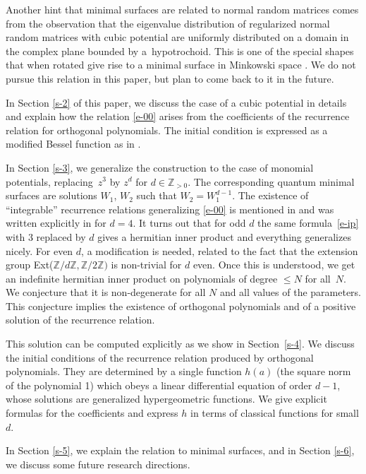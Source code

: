\documentclass[10pt,a4paper]{amsart}
\numberwithin{equation}{section}
\theoremstyle{definition}
\begin{document}
Another hint that minimal surfaces are related to normal random matrices comes from the observation that the eigenvalue distribution of regularized normal random matrices \cite{ElbauFelder2005,WiegmannZabrodin2000} with cubic potential are uniformly distributed on a domain in the complex plane bounded by a~hypotrochoid. This is one of the special shapes that when rotated give rise to a minimal surface in Minkowski space \cite{Hoppe2009}. We do not pursue this relation in this paper, but plan to come back to it in the future.

In Section \ref{s-2} of this paper, we discuss the case of a cubic potential in details and explain how the relation \eqref{e-00} arises from the coefficients of the recurrence relation for orthogonal polynomials. The initial condition is expressed as a modified Bessel function as in \cite{CDHM2025,Hoppe2025}.

In Section \ref{s-3}, we generalize the construction to the case of monomial potentials, replacing~$z^3$ by $z^d$ for $d\in\mathbb Z_{>0}$. The corresponding quantum minimal surfaces are solutions $W_1$, $W_2$ such that $W_2=W_1^{d-1}$. The existence of ``integrable'' recurrence relations generalizing \eqref{e-00} is mentioned in \cite{AHK2019} and was written explicitly in \cite{CDHM2025,Hoppe2025} for $d=4$. It turns out that for odd $d$ the same formula~\eqref{e-ip} with $3$ replaced by $d$ gives a hermitian inner product and everything generalizes nicely. For even $d$, a modification is needed, related to the fact that the extension group Ext($\mathbb Z/d\mathbb Z,\mathbb Z/2\mathbb Z)$ is non-trivial for $d$ even. Once this is understood, we get an indefinite hermitian inner product on polynomials of degree $\leq N$ for all~$N$. We conjecture that it is non-degenerate for all $N$ and all values of the parameters. This conjecture implies the existence of orthogonal polynomials and of a positive solution of the recurrence relation.

This solution can be computed explicitly as we show in Section~\ref{s-4}. We discuss the initial conditions of the recurrence relation produced by orthogonal polynomials. They are determined by a single function $h(a)$ (the square norm of the polynomial 1) which obeys a linear differential equation of order $d-1$, whose solutions are generalized hypergeometric functions. We give explicit formulas for the coefficients and express $h$ in terms of classical functions for small $d$.

In Section \ref{s-5}, we explain the relation to minimal surfaces, and in Section \ref{s-6}, we discuss some future research directions.
\end{document}
